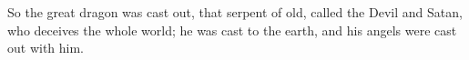 
\bverse 
\bverse 
\bverse 
\bverse 
\bverse 
\bverse 
\bverse 
\bverse 
\bverse So the great dragon was cast out, that serpent of old, called the Devil and Satan, who deceives the whole world; he was cast to the earth, and his angels were cast out with him.
\bverse 
\bverse 
\bverse 
\bverse 
\bverse 
\bverse 
\bverse 
\bverse 
